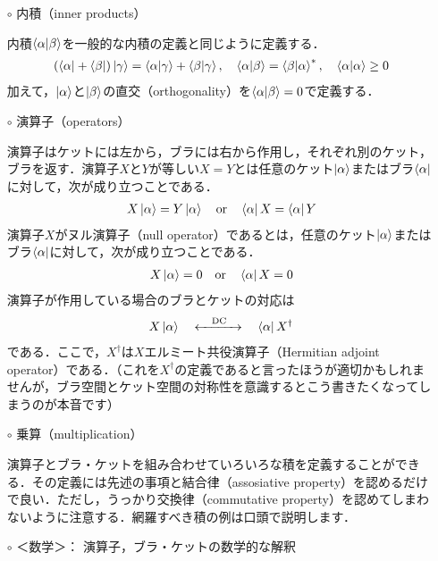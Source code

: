 \documentclass{jarticle}
\begin{document}
\begin{enumerate}
\begin{itemize}
  \item [$\circ$] 内積（inner products）
    
    内積$\bra{\alpha}\ket{\beta}$を一般的な内積の定義と同じように定義する．
    \begin{align}
      \qty(\bra{\alpha} + \bra{\beta}) \ket{\gamma}
      = \bra{\alpha}\ket{\gamma} + \bra{\beta}\ket{\gamma}, \quad
      \bra{\alpha}\ket{\beta} = \bra{\beta}\ket{\alpha}^*, \quad
      \bra{\alpha}\ket{\alpha} \geq 0 
    \end{align}
    加えて，$\ket{\alpha}$と$\ket{\beta}$の直交（orthogonality）を$\bra{\alpha}\ket{\beta} = 0$で定義する．

  \item [$\circ$] 演算子（operators）

    演算子はケットには左から，ブラには右から作用し，それぞれ別のケット，ブラを返す．演算子$X$と$Y$が等しい$X = Y$とは任意のケット$\ket{\alpha}$またはブラ$\bra{\alpha}$に対して，次が成り立つことである．
    \begin{align}
      X\ket{\alpha} = Y\ket{\alpha} \quad \mathrm{or} \quad \bra{\alpha}X = \bra{\alpha}Y
    \end{align}
    演算子$X$がヌル演算子（null operator）であるとは，任意のケット$\ket{\alpha}$またはブラ$\bra{\alpha}$に対して，次が成り立つことである．
    \begin{align}
      X \ket{\alpha} = 0 \quad \mathrm{or} \quad \bra{\alpha} X = 0
    \end{align}
    演算子が作用している場合のブラとケットの対応は
    \begin{align}
      X \ket{\alpha} \quad \xleftrightarrow{\quad\mathrm{DC}\quad} \quad \bra{\alpha}X^\dagger
    \end{align}
    である．ここで，$X^\dagger$は$X$エルミート共役演算子（Hermitian adjoint operator）である．（これを$X^\dagger$の定義であると言ったほうが適切かもしれませんが，ブラ空間とケット空間の対称性を意識するとこう書きたくなってしまうのが本音です）

  \item [$\circ$] 乗算（multiplication）

    演算子とブラ・ケットを組み合わせていろいろな積を定義することができる．その定義には先述の事項と結合律（assosiative property）を認めるだけで良い．ただし，うっかり交換律（commutative property）を認めてしまわないように注意する．網羅すべき積の例は口頭で説明します．

  \item [$\circ$]＜数学＞： 演算子，ブラ・ケットの数学的な解釈


\end{itemize}
\end{enumerate}
\end{document}
